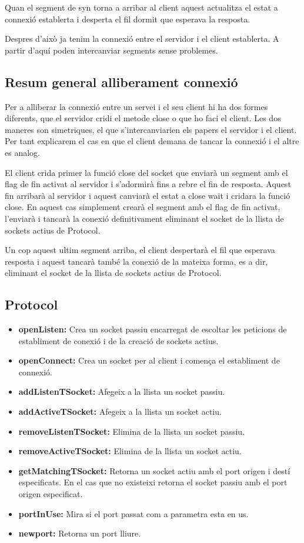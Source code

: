 \documentclass[12pt, a4papre]{article}
\begin{document}
	Quan el segment de syn torna a arribar al client aquest actualitza el estat a connexió establerta i desperta el fil dormit que esperava la resposta.
	
	Despres d'això ja tenim la connexió entre el servidor i el client establerta. A partir d'aquí poden intercanviar segments sense problemes.
	\newpage
	\subsection{Resum general alliberament connexió}
	
	Per a alliberar la connexió entre un servei i el seu client hi ha dos formes diferents, que el servidor cridi el metode close o que ho faci el client. Les dos maneres son simetriques, el que s'intercanviarien els papers el servidor i el client. Per tant explicarem el cas en que el client demana de tancar la connexió i el altre es analog.
	
	El client crida primer la funció close del socket que enviarà un segment amb el flag de fin activat al servidor i s'adormirà fins a rebre el fin de resposta. Aquest fin arribarà al servidor i aquest canviarà el estat a close wait i cridara la funció close. En aquest cas simplement crearà el segment amb el flag de fin activat, l'enviarà i tancarà la conexió definitivament eliminant el socket de la llista de sockets actius de Protocol.
	
	Un cop aquest ultim segment arriba, el client despertarà el fil que esperava resposta i aquest tancarà també la conexió de la mateixa forma, es a dir, eliminant el socket de la llista de sockets actius de Protocol.
	
	
	
	\subsection{Protocol}
	
	\begin{itemize}
		\item \textbf{openListen:} Crea un socket passiu encarregat de escoltar les peticions de establiment de conexió i de la creació de sockets actius.
		\item  \textbf{openConnect:} Crea un socket per al client i comença el establiment de connexió.
		\item  \textbf{addListenTSocket:} Afegeix a la llista un socket passiu.
		\item  \textbf{addActiveTSocket:} Afegeix a la llista un socket actiu.
		\item  \textbf{removeListenTSocket:} Elimina de la llista un socket passiu.
		\item  \textbf{removeActiveTSocket:} Elimina de la llista un socket actiu.
		\item  \textbf{getMatchingTSocket:} Retorna un socket actiu amb el port origen i destí especificats. En el cas que no existeixi retorna el socket passiu amb el port origen especificat.
		\item  \textbf{portInUse:} Mira si el port passat com a parametra esta en us.
		\item  \textbf{newport:} Retorna un port lliure.
	\end{itemize}
	
\end{document}
